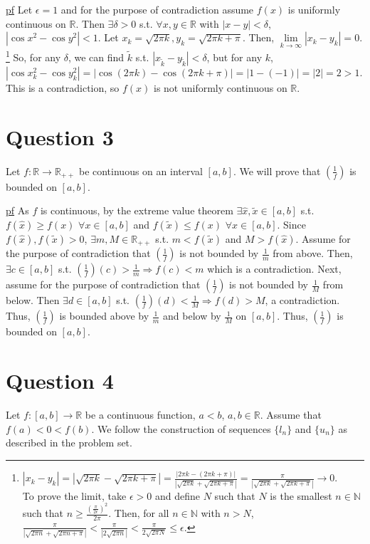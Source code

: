 \documentclass[11pt]{article} %
\begin{document}
	\underline{pf} Let $\epsilon = 1$ and for the purpose of contradiction assume $f(x)$ is uniformly continuous on $\mathbb{R}$. Then $\exists \delta>0$ s.t. $\forall x,y \in \mathbb{R} $ with $|x - y|<\delta$, $|\cos{x^2} - \cos{y^2}|<1.$ Let $x_k = \sqrt{2 \pi k}, y_k = \sqrt{2 \pi k + \pi }.$ Then, $\lim\limits_{k \rightarrow \infty } |x_k - y_k| = 0.$\footnote{$|x_k - y_k| = |\sqrt{2 \pi k} - \sqrt{2 \pi k + \pi}| = \frac{|2 \pi k - (2 \pi k + \pi)|}{|\sqrt{2 \pi k} + \sqrt{2 \pi k + \pi }|} = \frac{\pi}{|\sqrt{2 \pi k} + \sqrt{2 \pi k + \pi}|} \rightarrow 0$.\\ To prove the limit, take $\epsilon >0$ and define $N$ such that $N$ is the smallest $n \in \mathbb{N}$ such that $n \geq \frac{\left( \frac{\pi}{2\epsilon}\right)^2}{2 \pi}$. Then, for all $n \in \mathbb{N}$ with $n>N$,  $\frac{\pi}{|\sqrt{2 \pi n} + \sqrt{2 \pi n + \pi}|} < \frac{\pi}{|2\sqrt{2 \pi n}|} < \frac{\pi}{2\sqrt{2 \pi N}} \leq \epsilon$.} So, for any $\delta$, we can find $\tilde{k}$ s.t. $|x_{\tilde{k}} - y_{\tilde{k}}| < \delta$, but for any $k$, $|\cos{x_k^2} - \cos{y_k^2}| = |\cos{(2 \pi k)} - \cos{(2 \pi k + \pi)}| = |1 - (-1)| = |2| = 2 > 1.$ This is a contradiction, so $f(x)$ is not uniformly continuous on $\mathbb{R}$.
	\section{Question 3}
	Let $f: \mathbb{R} \rightarrow \mathbb{R}_{++}$ be continuous on an interval $[a,b]$. We will prove that $(\frac{1}{f})$ is bounded on $[a,b]$.
	
	\underline{pf} As $f$ is continuous, by the extreme value theorem $\exists \hat{x},\tilde{x} \in [a,b]$ s.t. $f(\hat{x}) \geq f(x)$ $\forall x \in [a,b]$ and $f(\tilde{x}) \leq f(x)$ $\forall x \in [a,b]$. Since $f(\hat{x}),f(\tilde{x}) >0$, $\exists m,M \in \mathbb{R_{++}}$ s.t. $m <f(\tilde{x})$ and $M > f(\hat{x})$. Assume for the purpose of contradiction that $(\frac{1}{f})$ is not bounded by $\frac{1}{m}$ from above. Then, $\exists c \in [a,b]$ s.t. $(\frac{1}{f})(c) >\frac{1}{m} \Rightarrow f(c) < m$ which is a contradiction. Next, assume for the purpose of contradiction that $(\frac{1}{f})$ is not bounded by $\frac{1}{M}$ from below. Then $\exists d \in [a,b]$ s.t. $(\frac{1}{f})(d) < \frac{1}{M} \Rightarrow f(d) > M$, a contradiction. Thus, $(\frac{1}{f})$ is bounded above by $\frac{1}{m}$ and below by $\frac{1}{M}$ on $[a,b]$. Thus, $(\frac{1}{f})$ is bounded on $[a,b]$.
	
	\section{Question 4}
	Let $f:[a,b] \rightarrow \mathbb{R}$ be a continuous function, $a<b$, $a,b \in \mathbb{R}.$ Assume that $f(a) < 0 < f(b)$. We follow the construction of sequences $\{ l_n \}$ and $\{ u_n \}$ as described in the problem set.
\end{document}
